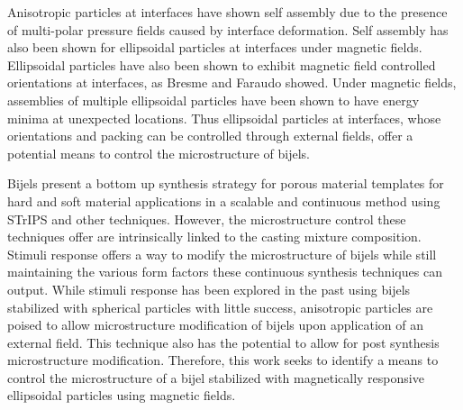 Anisotropic particles at interfaces have shown self assembly due to the presence of multi-polar pressure fields caused by interface deformation. Self assembly has also been shown for ellipsoidal particles at interfaces under magnetic fields. Ellipsoidal particles have also been shown to exhibit magnetic field controlled orientations at interfaces, as Bresme and Faraudo showed. \cite{bresme_orientational_2007, davies_interface_2014} Under magnetic fields, assemblies of multiple ellipsoidal particles have been shown to have energy minima at unexpected locations. \cite{newton_influence_2014, newton_capillary_2018} Thus ellipsoidal particles at interfaces, whose orientations and packing can be controlled through external fields, offer a potential means to control the microstructure of bijels.

Bijels present a bottom up synthesis strategy for porous material templates for hard and soft material applications in a scalable and continuous method using STrIPS and other techniques. However, the microstructure control these techniques offer are intrinsically linked to the casting mixture composition. Stimuli response offers a way to modify the microstructure of bijels while still maintaining the various form factors these continuous synthesis techniques can output. While stimuli response has been explored in the past using bijels stabilized with spherical particles with little success, anisotropic particles are poised to allow microstructure modification of bijels upon application of an external field. This technique also has the potential to allow for post synthesis microstructure modification. Therefore, this work seeks to identify a means to control the microstructure of a bijel stabilized with magnetically responsive ellipsoidal particles using magnetic fields.




